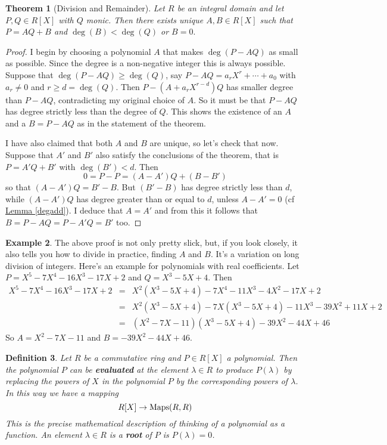 \documentclass[11pt]{amsbook}
\newtheorem{theorem}{Theorem}[section]
\newtheorem{definition}[theorem]{Definition}
\theoremstyle{definition}
\newtheorem{ex}[theorem]{Example}
\begin{document}
\begin{theorem}[Division and Remainder]
\label{euclid} Let $R$ be an integral domain and  let $P, Q\in R[X]$ with $Q$ monic.
Then there exists unique $A, B\in R[X]$ such
that
$ P = AQ + B$ and $\deg (B) < \deg (Q)$ or $B = 0.$
\end{theorem}
\begin{proof}
I begin by choosing a polynomial $A$ that makes $\deg (P-AQ)$ as small as possible. Since the degree is a non-negative integer this is always possible. Suppose that $\deg (P-AQ) \geqslant \deg (Q)$, say $P -AQ = a_rX^r + \cdots + a_0$ with $a_r\neq 0$ and $r\geqslant d = \deg (Q)$. Then $P - (A+a_rX^{r-d})Q$ has smaller degree than $P-AQ$, contradicting my original choice of $A$. So it must be that $P-AQ$ has degree strictly less than the degree of $Q$. This shows the existence of an $A$ and a $B = P-AQ$ as in the statement of the theorem.

I have also claimed that both $A$ and $B$ are unique, so let's check that now. Suppose that $A'$ and $B'$ also satisfy the conclusions of the theorem, that is $P = A'Q + B'$ with $\deg (B') < d$. Then $$ 0 = P - P = (A - A')Q + (B-B') $$ so that $(A-A')Q = B'-B$. But $(B'-B)$ has degree strictly less than $d$, while $(A-A')Q$  has degree greater than or equal to $d$, unless $A - A' = 0$ (cf \hyperref[degadd]{Lemma \ref{degadd}}). I deduce that $A = A'$ and from this it follows that $B = P - AQ = P - A'Q = B'$ too.
\end{proof}

\begin{ex} The above proof is not only pretty slick, but, if you look closely, it also tells you how to divide in practice, finding $A$ and $B$. It's a variation on long division of integers. Here's an example for polynomials with real coefficients. Let $P = X^5 - 7 X^4 - 16 X^3 - 17 X + 2$ and $Q = X^3 - 5X +4$. Then
\begin{eqnarray*}
X^5 - 7 X^4 - 16 X^3 - 17 X + 2 & = & X^2 ( X^3 - 5X +4) - 7X^4 - 11 X^3 - 4X^2 - 17X + 2 \\ & = & X^2 ( X^3 - 5X +4) - 7X ( X^3 - 5X +4) - 11 X^3 - 39X^2 + 11X +2 \\ & = & (X^2 - 7X -11) ( X^3 - 5X +4) - 39 X^2 - 44X + 46
\end{eqnarray*}
So $A = X^2 - 7X -11$ and $B = -39X^2 -44X + 46$.
\end{ex}

\begin{definition} \label{rootdef}Let $R$ be a commutative ring and $P\in R[X]$ a polynomial. Then the polynomial $P$ can be {\bf evaluated} at the element $\lambda \in R$ to produce $P(\lambda)$ by replacing the powers of $X$ in the polynomial $P$ by the corresponding powers of $\lambda$. In this way we have a mapping $$R[X] \to {\rm Maps}(R,R)$$ This is the precise mathematical description of thinking of a polynomial as a function. An element $\lambda \in R$ is a {\bf root} of $P$ is $P(\lambda) = 0$.
\end{definition}
\end{document}
